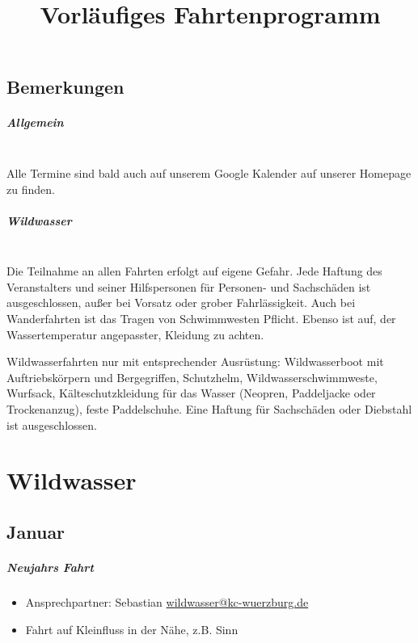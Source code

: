 \documentclass[12pt, a4paper]{report}
\title{Vorläufiges Fahrtenprogramm}
\date{}
\begin{document}
\begingroup
    \hypersetup{hidelinks}
    \tableofcontents\thispagestyle{fancy}
\endgroup
\reversemarginpar

\section*{Bemerkungen}\paragraph{Allgemein}\mbox{}\\
Alle Termine sind bald auch auf unserem Google Kalender auf unserer Homepage zu finden.
\paragraph{Wildwasser}\mbox{}\\
Die Teilnahme an allen Fahrten erfolgt auf eigene Gefahr. Jede Haftung des Veranstalters und seiner Hilfspersonen für Personen- und Sachschäden ist ausgeschlossen, außer bei Vorsatz oder grober Fahrlässigkeit. Auch bei Wanderfahrten ist das Tragen von Schwimmwesten Pflicht. Ebenso ist auf, der Wassertemperatur angepasster, Kleidung zu achten.


Wildwasserfahrten nur mit entsprechender Ausrüstung: Wildwasserboot mit Auftriebskörpern und Bergegriffen, Schutzhelm, Wildwasserschwimmweste, Wurfsack, Kälteschutzkleidung für das Wasser (Neopren, Paddeljacke oder Trockenanzug), feste Paddelschuhe. Eine Haftung für Sachschäden oder Diebstahl ist ausgeschlossen.\chapter*{Wildwasser}
\thispagestyle{Wildwasser}
\pagestyle{Wildwasser}
\section*{Januar}\paragraph{Neujahrs Fahrt}
\begin{itemize}
    \item Ansprechpartner: Sebastian \href{mailto:wildwasser@kc-wuerzburg.de}{wildwasser@kc-wuerzburg.de}
    \item Fahrt auf Kleinfluss in der Nähe, z.B. Sinn 
\end{itemize}
\end{document}
